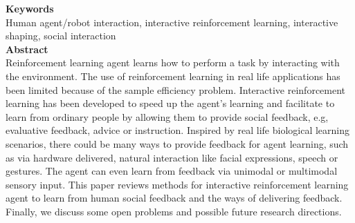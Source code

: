\documentclass[report.tex]{subfiles}
\begin{document}
\noindent\textbf{Keywords} \\
Human agent/robot interaction, interactive reinforcement learning, interactive shaping, social interaction
   \\

\noindent\textbf{Abstract} \\
Reinforcement learning agent learns how to perform a task by interacting with the environment. The use of reinforcement learning in real life applications has been limited because of the sample efficiency problem. Interactive reinforcement learning has been developed to speed up the agent’s learning and facilitate to learn from ordinary people by allowing them to provide social feedback, e.g, evaluative feedback, advice or instruction. Inspired by real life biological learning scenarios, there could be many ways to provide feedback for agent learning, such as via hardware delivered, natural interaction like facial expressions, speech or gestures. The agent can even learn from feedback via unimodal or multimodal sensory input. This paper reviews methods for interactive reinforcement learning agent to learn from human social feedback and the ways of delivering feedback. Finally, we discuss some open problems and possible future research directions.
\\
\end{document}
